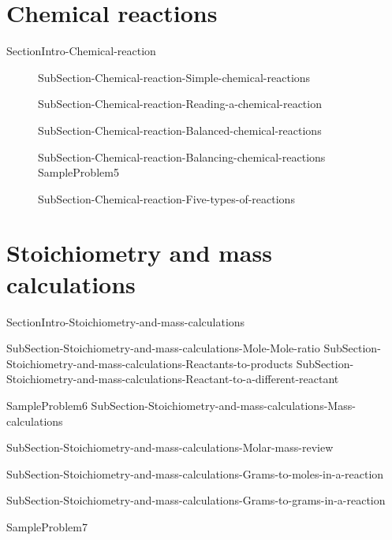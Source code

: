 \documentclass[main.tex]{subfiles}
\newcommand\chapterlabel{Ch-mole}\setcounter{figurenewcounter}{0}\setcounter{tablenewcounter}{0}\setcounter{formulanewcounter}{0}
\begin{document}
\section{Chemical reactions}
{SectionIntro-Chemical-reaction}
\sloppy\begin{description}
\item[] {SubSection-Chemical-reaction-Simple-chemical-reactions}
\item[]{SubSection-Chemical-reaction-Reading-a-chemical-reaction}
\item[]{SubSection-Chemical-reaction-Balanced-chemical-reactions}
\item[]{SubSection-Chemical-reaction-Balancing-chemical-reactions}
{SampleProblem5}
\item[]{SubSection-Chemical-reaction-Five-types-of-reactions}
\end{description}



\section{Stoichiometry and mass calculations}
{SectionIntro-Stoichiometry-and-mass-calculations}


\sloppy \begin{description}

{SubSection-Stoichiometry-and-mass-calculations-Mole-Mole-ratio}
{SubSection-Stoichiometry-and-mass-calculations-Reactants-to-products}
{SubSection-Stoichiometry-and-mass-calculations-Reactant-to-a-different-reactant}








{SampleProblem6}
{SubSection-Stoichiometry-and-mass-calculations-Mass-calculations}

{SubSection-Stoichiometry-and-mass-calculations-Molar-mass-review}


{SubSection-Stoichiometry-and-mass-calculations-Grams-to-moles-in-a-reaction}




{SubSection-Stoichiometry-and-mass-calculations-Grams-to-grams-in-a-reaction}


{SampleProblem7}

\end{description}
\end{document}

